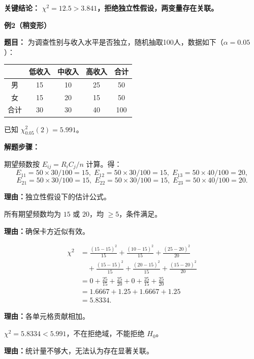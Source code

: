 \begin{examplebox}
	\textbf{\textcolor{CExample}{关键结论：}}
	\textbf{$\chi^2=12.5>3.841$，拒绝独立性假设，两变量存在关联。}

	\medskip
	\textbf{\textcolor{CExample}{例2（稍变形）}}

	\textbf{\textcolor{CExample}{题目：}}
	为调查性别与收入水平是否独立，随机抽取100人，数据如下（$\alpha=0.05$）：

	\begin{center}
		\begin{tabular}{c|ccc|c}
			& 低收入 & 中收入 & 高收入 & 合计 \\ \hline
			男 & 15 & 10 & 25 & 50 \\
			女 & 15 & 20 & 15 & 50 \\ \hline
			合计 & 30 & 30 & 40 & 100
		\end{tabular}
	\end{center}
	已知 $\chi^2_{0.05}(2)=5.991$。

	\textbf{\textcolor{CExample}{解题步骤：}}
	\begin{description}[style=nextline, leftmargin=2.8em, labelsep=0.5em, itemsep=0.45em]
		\item[\textbf{第一步（计算期望）：}]
			期望频数按 $E_{ij}=R_iC_j/n$ 计算。得：
			\[
				E_{11}=50\times30/100=15,\; E_{12}=50\times30/100=15,\; E_{13}=50\times40/100=20,
			\]
			\[
				E_{21}=50\times30/100=15,\; E_{22}=50\times30/100=15,\; E_{23}=50\times40/100=20.
			\]
			\par\textbf{理由：}独立性假设下的估计公式。
		\item[\textbf{第二步（检查条件）：}]
			所有期望频数均为 $15$ 或 $20$，均 $\geq 5$，条件满足。
			\par\textbf{理由：}确保卡方近似有效。
		\item[\textbf{第三步（计算统计量）：}]
			\[
				\begin{aligned}
					\chi^2 &=\frac{(15-15)^2}{15}+\frac{(10-15)^2}{15}+\frac{(25-20)^2}{20} \\
					&\quad +\frac{(15-15)^2}{15}+\frac{(20-15)^2}{15}+\frac{(15-20)^2}{20} \\
					&=0+\frac{25}{15}+\frac{25}{20}+0+\frac{25}{15}+\frac{25}{20} \\
					&=1.6667+1.25+1.6667+1.25 \\
					&=5.8334.
			\end{aligned}
			\]
			\par\textbf{理由：}各单元格贡献相加。
		\item[\textbf{第四步（假设检验决策）：}]
			$\chi^2=5.8334 < 5.991$，不在拒绝域，不能拒绝 $H_0$。
			\par\textbf{理由：}统计量不够大，无法认为存在显著关联。
	\end{description}


\end{examplebox}
